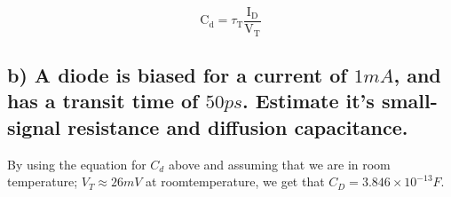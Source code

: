 \begin{equation*}
    \mathrm{C}_{\mathrm{d}}=\tau_{\mathrm{T}} \frac{\mathrm{I}_{\mathrm{D}}}{\mathrm{V}_{\mathrm{T}}} 
\end{equation*}




\subsection*{b) A diode is biased for a current of $1 mA$, and has a transit time of $50 ps$. Estimate
it’s small-signal resistance and diffusion capacitance.}

By using the equation for $C_d$ above and assuming that we are in room temperature; $V_T\approx26 mV$ at roomtemperature, we get that $C_D=3.846\times 10^{-13}F$.
